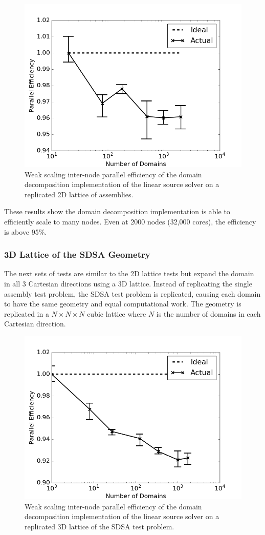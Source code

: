 \begin{figure}[h!]
	\centering
	\includegraphics[width=0.6\linewidth]{figures/DD/dd-ws-2D.png}
	\caption[]{Weak scaling inter-node parallel efficiency of the domain decomposition implementation of the linear source solver on a replicated 2D lattice of assemblies.}
	\label{fig:dd-ws-2D}
\end{figure}

These results show the domain decomposition implementation is able to efficiently scale to many nodes. Even at 2000 nodes (32,000 cores), the efficiency is above 95\%.

\subsubsection{3D Lattice of the SDSA Geometry}

The next sets of tests are similar to the 2D lattice tests but expand the domain in all 3 Cartesian directions using a 3D lattice. Instead of replicating the single assembly test problem, the SDSA test problem is replicated, causing each domain to have the same geometry and equal computational work. The geometry is replicated in a $N \times N \times N$ cubic lattice where $N$ is the number of domains in each Cartesian direction.

\begin{figure}[h!]
	\centering
	\includegraphics[width=0.6\linewidth]{figures/DD/dd-ws-3D.png}
	\caption[]{Weak scaling inter-node parallel efficiency of the domain decomposition implementation of the linear source solver on a replicated 3D lattice of the SDSA test problem.}
	\label{fig:dd-ws-3D}
\end{figure}

